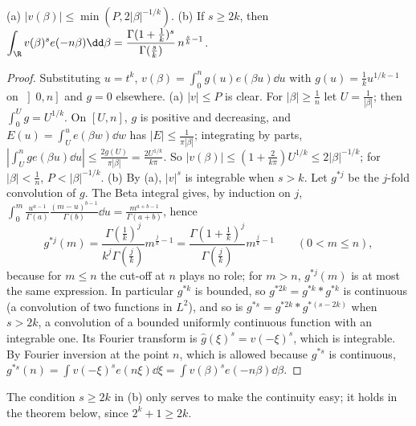 \begin{lemma}\label{lem:singint}
(a) $|v(\beta)|\le\min(P,2|\beta|^{-1/k})$.
(b) If $s\ge2k$, then $\displaystyle\int_\R v(\beta)^se(-n\beta)\dd\beta=\frac{\Gamma(1+\frac1k)^s}{\Gamma(\frac sk)}\,n^{\frac sk-1}$.
\end{lemma}
\begin{proof}
Substituting $u=t^k$, $v(\beta)=\int_0^ng(u)e(\beta u)\dd u$ with $g(u)=\frac1ku^{1/k-1}$ on $\left]0,n\right]$ and $g=0$ elsewhere.
(a) $|v|\le P$ is clear. For $|\beta|\ge\frac1n$ let $U=\frac1{|\beta|}$; then $\int_0^Ug=U^{1/k}$. On $[U,n]$, $g$ is positive and decreasing, and $E(u)=\int_U^ue(\beta w)\dd w$ has $|E|\le\frac1{\pi|\beta|}$; integrating by parts, $|\int_U^nge(\beta u)\dd u|\le\frac{2g(U)}{\pi|\beta|}=\frac{2U^{1/k}}{k\pi}$. So $|v(\beta)|\le(1+\frac2{k\pi})U^{1/k}\le2|\beta|^{-1/k}$; for $|\beta|<\frac1n$, $P<|\beta|^{-1/k}$.
(b) By (a), $|v|^s$ is integrable when $s>k$. Let $g^{*j}$ be the $j$-fold convolution of $g$. The Beta integral gives, by induction on $j$, $\int_0^m\frac{u^{a-1}}{\Gamma(a)}\frac{(m-u)^{b-1}}{\Gamma(b)}\dd u=\frac{m^{a+b-1}}{\Gamma(a+b)}$, hence
\[
g^{*j}(m)=\frac{\Gamma(\frac1k)^j}{k^j\Gamma(\frac jk)}m^{\frac jk-1}=\frac{\Gamma(1+\frac1k)^j}{\Gamma(\frac jk)}m^{\frac jk-1}\qquad(0<m\le n),
\]
because for $m\le n$ the cut-off at $n$ plays no role; for $m>n$, $g^{*j}(m)$ is at most the same expression. In particular $g^{*k}$ is bounded, so $g^{*2k}=g^{*k}*g^{*k}$ is continuous (a convolution of two functions in $L^2$), and so is $g^{*s}=g^{*2k}*g^{*(s-2k)}$ when $s>2k$, a convolution of a bounded uniformly continuous function with an integrable one. Its Fourier transform is $\hat g(\xi)^s=v(-\xi)^s$, which is integrable. By Fourier inversion at the point $n$, which is allowed because $g^{*s}$ is continuous, $g^{*s}(n)=\int v(-\xi)^se(n\xi)\dd\xi=\int v(\beta)^se(-n\beta)\dd\beta$.
\end{proof}

The condition $s\ge2k$ in (b) only serves to make the continuity easy; it holds in the theorem below, since $2^k+1\ge2k$.

